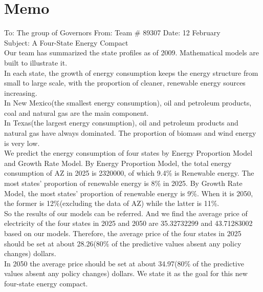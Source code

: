 \section{Memo}
To: The group of Governors From: Team \# 89307 Date: 12 February \\Subject: A Four-State Energy Compact\\
Our team has summarized the state profiles as of 2009. Mathematical models are built to illustrate it.\\
In each state, the growth of energy consumption keeps the energy structure from small to large scale, with the proportion of cleaner, renewable energy sources increasing.\\
In New Mexico(the smallest energy consumption), oil and petroleum products, coal and natural gas are the main component.\\
In Texas(the largest energy consumption), oil and petroleum products and natural gas have always dominated. The proportion of biomass and wind energy is very low.\\
We predict the energy consumption of four states by Energy Proportion Model and Growth Rate Model. 
By Energy Proportion Model, the total energy consumption of AZ in 2025 is 2320000, of which 9.4\% is Renewable energy. The most states' proportion of renewable energy is 8\% in 2025.
By Growth Rate Model, the most states' proportion of renewable energy is 9\%.
When it is 2050, the former is 12\%(excluding the data of AZ) while the latter is 11\%.\\
So the results of our models can be referred.
And we find the average price of electricity of the four states in 2025 and 2050 are 35.32732299 and 43.71283002 based on our models.
Therefore, the average price of the four states in 2025 should be set at about 28.26(80\% of the predictive values absent any policy changes) dollars.\\
In 2050 the average price should be set at about 34.97(80\% of the predictive values absent any policy changes) dollars. We state it as the goal for this new four-state energy compact.